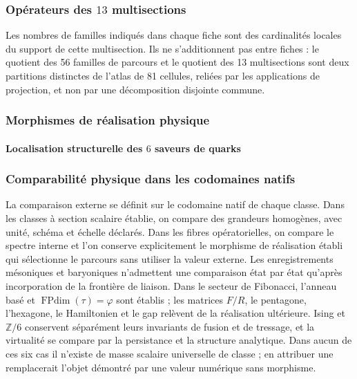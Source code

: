 
\subsubsection{Opérateurs des \(13\) multisections}

Les nombres de familles indiqués dans chaque fiche sont des cardinalités locales du
support de cette multisection. Ils ne s'additionnent pas entre fiches : le quotient des
56 familles de parcours et le quotient des 13 multisections sont deux partitions
distinctes de l'atlas de 81 cellules, reliées par les applications de projection, et non
par une décomposition disjointe commune.



\subsubsection{Morphismes de réalisation physique}




\paragraph{Localisation structurelle des \(6\) saveurs de quarks}




\subsubsection{Comparabilité physique dans les codomaines natifs}

La comparaison externe se définit sur le codomaine natif de chaque classe. Dans les
classes à section scalaire établie, on compare des grandeurs homogènes, avec unité,
schéma et échelle déclarés. Dans les fibres opératorielles, on compare le spectre
interne et l'on conserve explicitement le morphisme de réalisation établi qui
sélectionne le parcours sans utiliser la valeur externe. Les enregistrements mésoniques et baryoniques n'admettent une comparaison état par
état qu'après incorporation de la frontière de liaison. Dans le secteur de Fibonacci,
l'anneau basé et \(\operatorname{FPdim}(\tau)=\varphi\) sont établis ; les matrices
\(F/R\), le pentagone, l'hexagone, le Hamiltonien et le gap relèvent de la
réalisation ultérieure. Ising et \(\mathbb Z/6\) conservent séparément leurs invariants
de fusion et de tressage, et la virtualité se compare par la persistance et la structure
analytique. Dans aucun de ces six
cas il n'existe de masse scalaire universelle de classe ; en attribuer une remplacerait l'objet
démontré par une valeur numérique sans morphisme.
